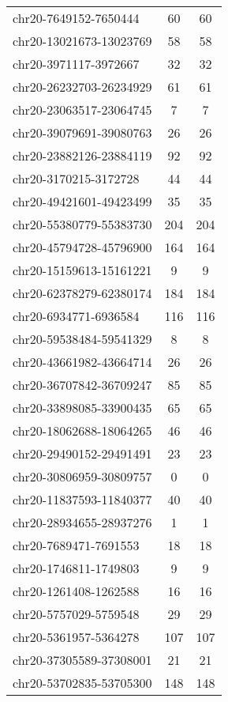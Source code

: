 \documentclass[10pt,letterpaper]{article}
\begin{document}
{\begin{longtable}{lSS}
	chr20-7649152-7650444   & 60     & 60       \\
	chr20-13021673-13023769 & 58     & 58       \\
	chr20-3971117-3972667   & 32     & 32       \\
	chr20-26232703-26234929 & 61     & 61       \\
	chr20-23063517-23064745 & 7      & 7        \\
	chr20-39079691-39080763 & 26     & 26       \\
	chr20-23882126-23884119 & 92     & 92       \\
	chr20-3170215-3172728   & 44     & 44       \\
	chr20-49421601-49423499 & 35     & 35       \\
	chr20-55380779-55383730 & 204    & 204      \\
	chr20-45794728-45796900 & 164    & 164      \\
	chr20-15159613-15161221 & 9      & 9        \\
	chr20-62378279-62380174 & 184    & 184      \\
	chr20-6934771-6936584   & 116    & 116      \\
	chr20-59538484-59541329 & 8      & 8        \\
	chr20-43661982-43664714 & 26     & 26       \\
	chr20-36707842-36709247 & 85     & 85       \\
	chr20-33898085-33900435 & 65     & 65       \\
	chr20-18062688-18064265 & 46     & 46       \\
	chr20-29490152-29491491 & 23     & 23       \\
	chr20-30806959-30809757 & 0      & 0        \\
	chr20-11837593-11840377 & 40     & 40       \\
	chr20-28934655-28937276 & 1      & 1        \\
	chr20-7689471-7691553   & 18     & 18       \\
	chr20-1746811-1749803   & 9      & 9        \\
	chr20-1261408-1262588   & 16     & 16       \\
	chr20-5757029-5759548   & 29     & 29       \\
	chr20-5361957-5364278   & 107    & 107      \\
	chr20-37305589-37308001 & 21     & 21       \\
	chr20-53702835-53705300 & 148    & 148      \\

\end{longtable}}
\end{document}
